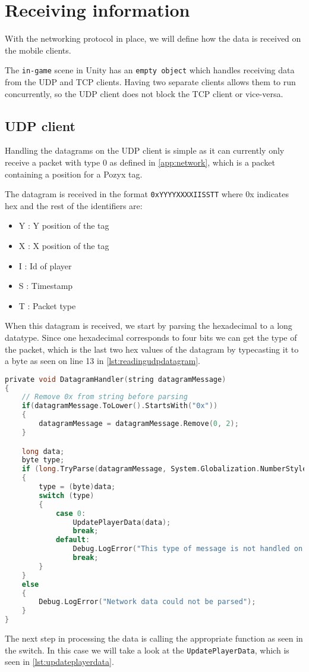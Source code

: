 \section{Receiving information}\label{sec:receiving-the-information}
With the networking protocol in place, we will define how the data is received on the mobile clients.

The \texttt{in-game} scene in Unity has an \texttt{empty object} which handles receiving data from the UDP and TCP clients.
Having two separate clients allows them to run concurrently, so the UDP client does not block the TCP client or vice-versa.

\subsection*{UDP client}
Handling the datagrams on the UDP client is simple as it can currently only receive a packet with type 0 as defined in \autoref{app:network}, which is a packet containing a position for a Pozyx tag.

The datagram is received in the format \texttt{0xYYYYXXXXIISSTT} where 0x indicates hex and the rest of the identifiers are:
\begin{itemize}
    \item Y : Y position of the tag
    \item X : X position of the tag
    \item I : Id of player
    \item S : Timestamp
    \item T : Packet type
\end{itemize}

\noindent
When this datagram is received, we start by parsing the hexadecimal to a long datatype.
Since one hexadecimal corresponds to four bits we can get the type of the packet, which is the last two hex values of the datagram by typecasting it to a byte as seen on line 13 in \autoref{lst:readingudpdatagram}.

\begin{lstlisting}[caption={Processing datagrams in UDP client}, captionpos=b,language=C,label={lst:readingudpdatagram}]
private void DatagramHandler(string datagramMessage)
{
    // Remove 0x from string before parsing
    if(datagramMessage.ToLower().StartsWith("0x"))
    {
        datagramMessage = datagramMessage.Remove(0, 2);
    }

    long data;
    byte type;
    if (long.TryParse(datagramMessage, System.Globalization.NumberStyles.HexNumber, System.Globalization.CultureInfo.InvariantCulture, out data))
    {
        type = (byte)data;
        switch (type)
        {
            case 0:
                UpdatePlayerData(data);
                break;
            default:
                Debug.LogError("This type of message is not handled on UDP");
                break;
        }
    }
    else
    {
        Debug.LogError("Network data could not be parsed");
    }
}
\end{lstlisting}
\noindent 
The next step in processing the data is calling the appropriate function as seen in the switch. 
In this case we will take a look at the \texttt{UpdatePlayerData}, which is seen in \autoref{lst:updateplayerdata}.


